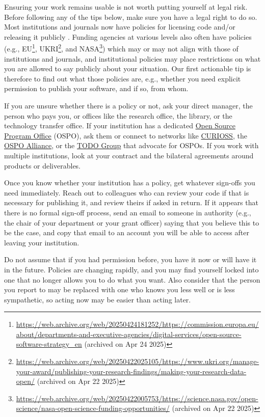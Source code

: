 \documentclass[10pt,letterpaper]{article}
\begin{document}
Ensuring your work remains usable is not worth putting yourself at legal risk.
Before following any of the tips below,
make sure you have a legal right to do so.
Most institutions and journals now have policies for licensing code and/or releasing it publicly \cite{Katz2018,Ham2019}.
Funding agencies at various levels also often have policies
(e.g.,
EU\footnote{\url{https://web.archive.org/web/20250424181252/https://commission.europa.eu/about/departments-and-executive-agencies/digital-services/open-source-software-strategy_en} (archived on Apr 24 2025)},
UKRI\footnote{\url{https://web.archive.org/web/20250422025105/https://www.ukri.org/manage-your-award/publishing-your-research-findings/making-your-research-data-open/} (archived on Apr 22 2025)},
and NASA\footnote{\url{https://web.archive.org/web/20250422005753/https://science.nasa.gov/open-science/nasa-open-science-funding-opportunities/} (archived on Apr 22 2025)})
which may or may not align with those of institutions and journals,
and institutional policies may place restrictions on what you are allowed to say publicly about your situation.
Our first actionable tip is therefore to find out what those policies are,
e.g.,
whether you need explicit permission to publish your software,
and if so,
from whom.

If you are unsure whether there is a policy or not,
ask your direct manager,
the person who pays you,
or offices like the research office,
the library,
or the technology transfer office.
If your institution has a dedicated
\href{https://sustainoss.org/academic-map/universities/index.html}{Open Source Program Office} (OSPO),
ask them
or connect to networks like \href{https://curioss.org}{CURIOSS},
the \href{https://ospo-alliance.org/}{OSPO Alliance},
or the \href{https://todogroup.org/}{TODO Group}
that advocate for OSPOs.
If you work with multiple institutions,
look at your contract and the bilateral agreements around products or deliverables.

Once you know whether your institution has a policy,
get whatever sign-offs you need immediately.
Reach out to colleagues who can review your code if that is necessary for publishing it,
and review theirs if asked in return.
If it appears that there is no formal sign-off process,
send an email to someone in authority
(e.g., the chair of your department or your grant officer)
saying that you believe this to be the case,
and copy that email to an account you will be able to access
after leaving your institution.

Do not assume that if you had permission before,
you have it now or will have it in the future.
Policies are changing rapidly,
and you may find yourself locked into one that no longer allows you to do what you want.
Also consider that the person you report to may be replaced with one who knows you less well or is less sympathetic,
so acting now may be easier than acting later.
\end{document}
